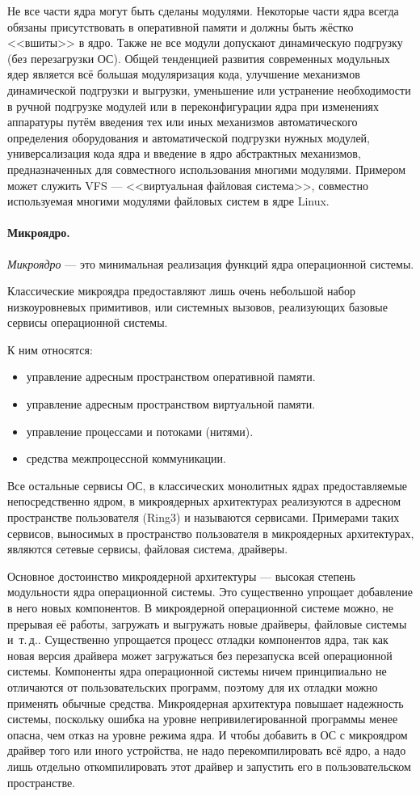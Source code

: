 Не все части ядра могут быть сделаны модулями. Некоторые части ядра всегда обязаны присутствовать в оперативной памяти и должны быть жёстко <<вшиты>> в ядро. Также не все модули допускают динамическую подгрузку (без перезагрузки ОС).
Общей тенденцией развития современных модульных ядер является всё большая модуляризация кода, улучшение механизмов динамической подгрузки и выгрузки, уменьшение или устранение необходимости в ручной подгрузке модулей или в переконфигурации ядра при изменениях аппаратуры путём введения тех или иных механизмов автоматического определения оборудования и автоматической подгрузки нужных модулей, универсализация кода ядра и введение в ядро абстрактных механизмов, предназначенных для совместного использования многими модулями. Примером может служить VFS --- <<виртуальная файловая система>>, совместно используемая многими модулями файловых систем в ядре Linux.

\paragraph{Микроядро.} \emph{Микроядро} --- это минимальная реализация функций ядра операционной системы.

Классические микроядра предоставляют лишь очень небольшой набор низкоуровневых примитивов, или системных вызовов, реализующих базовые сервисы операционной системы.

К ним относятся:
\begin{itemize}
 \item управление адресным пространством оперативной памяти.
 \item управление адресным пространством виртуальной памяти.
 \item управление процессами и потоками (нитями).
 \item средства межпроцессной коммуникации.
\end{itemize}

Все остальные сервисы ОС, в классических монолитных ядрах предоставляемые непосредственно ядром, в микроядерных архитектурах реализуются в адресном пространстве пользователя (Ring3) и называются сервисами. Примерами таких сервисов, выносимых в пространство пользователя в микроядерных архитектурах, являются сетевые сервисы, файловая система, драйверы.

Основное достоинство микроядерной архитектуры --- высокая степень модульности ядра операционной системы. Это существенно упрощает добавление в него новых компонентов. В микроядерной операционной системе можно, не прерывая её работы, загружать и выгружать новые драйверы, файловые системы и~т.\,д.. Существенно упрощается процесс отладки компонентов ядра, так как новая версия драйвера может загружаться без перезапуска всей операционной системы.
Компоненты ядра операционной системы ничем принципиально не отличаются от пользовательских программ, поэтому для их отладки можно применять обычные средства. Микроядерная архитектура повышает надежность системы, поскольку ошибка на уровне непривилегированной программы менее опасна, чем отказ на уровне режима ядра. И чтобы добавить в ОС с микроядром драйвер того или иного устройства, не надо перекомпилировать всё ядро, а надо лишь отдельно откомпилировать этот драйвер и запустить его в пользовательском пространстве.

